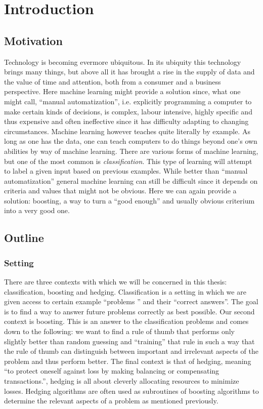 
\chapter{Introduction}
\label{chap:intro}
\section{Motivation}
\label{sec:motiv}

Technology is becoming evermore ubiquitous. In its ubiquity this technology brings many things, but above all it has brought a rise in the supply of data and the value of time and attention, both from a consumer and a business perspective. Here machine learning might provide a solution since, what one might call, ``manual automatization'', i.e. explicitly programming a computer to make certain kinds of decisions, is complex, labour intensive, highly specific and thus expensive and often ineffective since it has difficulty adapting to changing circumstances. Machine learning however teaches quite literally by example. As long as one has the data, one can teach computers to do things beyond one's own abilities by way of machine learning. There are various forms of machine learning, but one of the most common is \textit{classification}. This type of learning will attempt to label a given input based on previous examples. While better than ``manual automatization'' general machine learning can still be difficult since it depends on criteria and values that might not be obvious. Here we can again provide a solution: boosting, a way to turn a ``good enough'' and usually obvious criterium into a very good one.

\section{Outline}
\subsection{Setting}
There are three contexts with which we will be concerned in this thesis: classification, boosting and hedging.
Classification is a setting in which we are given access to certain example ``problems '' and their ``correct answers''. The goal is to find a way to answer future problems correctly as best possible. Our second context is boosting. This is an answer to the classification problems and comes down to the following: we want to find a rule of thumb that performs only slightly better than random guessing and ``training''  that rule in such a way that the rule of thumb  can distinguish between important and irrelevant aspects of the problem and thus perform better. The final context is that of hedging, meaning ``to protect oneself against loss by making balancing or compensating transactions.'', hedging is all about cleverly allocating resources to minimize losses. Hedging algorithms are often used as subroutines of boosting algorithms to determine the relevant aspects of a problem as mentioned previously. 
\newpage
